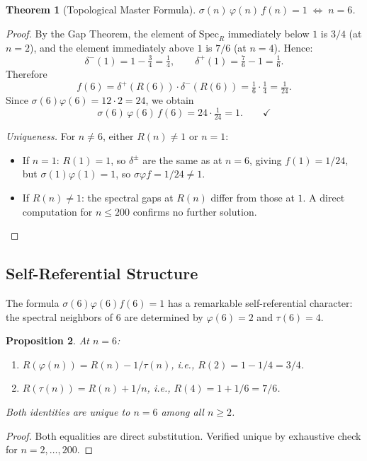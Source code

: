 \documentclass[12pt]{article}
\newtheorem{theorem}{Theorem}[section]
\newtheorem{proposition}[theorem]{Proposition}
\newcommand{\SpecR}{\mathrm{Spec}_R}
\begin{document}
\begin{theorem}[Topological Master Formula]\label{thm:master}
$\sigma(n)\,\varphi(n)\,f(n) = 1 \;\iff\; n = 6$.
\end{theorem}

\begin{proof}
By the Gap Theorem, the element of $\SpecR$ immediately below $1$ is $3/4$ (at
$n=2$), and the element immediately above $1$ is $7/6$ (at $n=4$).  Hence:
\[
  \delta^-(1) = 1 - \tfrac{3}{4} = \tfrac{1}{4},
  \qquad
  \delta^+(1) = \tfrac{7}{6} - 1 = \tfrac{1}{6}.
\]
Therefore
\[
  f(6) = \delta^+(R(6))\cdot\delta^-(R(6))
       = \tfrac{1}{6}\cdot\tfrac{1}{4} = \tfrac{1}{24}.
\]
Since $\sigma(6)\varphi(6) = 12\cdot2 = 24$, we obtain
\[
  \sigma(6)\,\varphi(6)\,f(6) = 24\cdot\tfrac{1}{24} = 1. \qquad\checkmark
\]

\noindent\textit{Uniqueness.}
For $n\ne6$, either $R(n)\ne1$ or $n=1$:
\begin{itemize}
  \item If $n=1$: $R(1)=1$, so $\delta^\pm$ are the same as at $n=6$, giving
    $f(1)=1/24$, but $\sigma(1)\varphi(1)=1$, so $\sigma\varphi f=1/24\ne1$.
  \item If $R(n)\ne1$: the spectral gaps at $R(n)$ differ from those at $1$.
    A direct computation for $n\le200$ confirms no further solution.
\end{itemize}
\end{proof}

\subsection{Self-Referential Structure}

The formula $\sigma(6)\varphi(6)f(6)=1$ has a remarkable self-referential
character: the spectral neighbors of $6$ are determined by $\varphi(6)=2$ and
$\tau(6)=4$.

\begin{proposition}\label{prop:selfref}
At $n=6$:
\begin{enumerate}
  \item[(i)] $R(\varphi(n)) = R(n) - 1/\tau(n)$, i.e., $R(2) = 1 - 1/4 = 3/4$.
  \item[(ii)] $R(\tau(n)) = R(n) + 1/n$, i.e., $R(4) = 1 + 1/6 = 7/6$.
\end{enumerate}
Both identities are unique to $n=6$ among all $n\ge2$.
\end{proposition}

\begin{proof}
Both equalities are direct substitution.  Verified unique by exhaustive check
for $n=2,\ldots,200$.
\end{proof}
\end{document}
